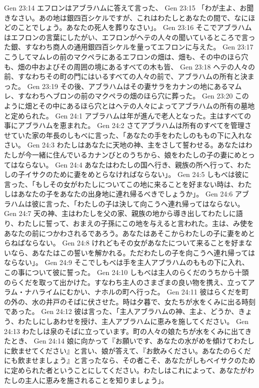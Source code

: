 Gen 23:14  エフロンはアブラハムに答えて言った、
Gen 23:15  「わが主よ、お聞きなさい。あの地は銀四百シケルですが、これはわたしとあなたの間で、なにほどのことでしょう。あなたの死人を葬りなさい」。
Gen 23:16  そこでアブラハムはエフロンの言葉にしたがい、エフロンがヘテの人々の聞いているところで言った銀、すなわち商人の通用銀四百シケルを量ってエフロンに与えた。
Gen 23:17  こうしてマムレの前のマクペラにあるエフロンの畑は、畑も、その中のほら穴も、畑の中およびその周囲の境にあるすべての木も皆、
Gen 23:18  ヘテの人々の前、すなわちその町の門にはいるすべての人々の前で、アブラハムの所有と決まった。
Gen 23:19  その後、アブラハムはその妻サラをカナンの地にあるマムレ、すなわちヘブロンの前のマクペラの畑のほら穴に葬った。
Gen 23:20  このように畑とその中にあるほら穴とはヘテの人々によってアブラハムの所有の墓地と定められた。
Gen 24:1  アブラハムは年が進んで老人となった。主はすべての事にアブラハムを恵まれた。
Gen 24:2  さてアブラハムは所有のすべてを管理させていた家の年長のしもべに言った、「あなたの手をわたしのももの下に入れなさい。
Gen 24:3  わたしはあなたに天地の神、主をさして誓わせる。あなたはわたしが今一緒に住んでいるカナンびとのうちから、娘をわたしの子の妻にめとってはならない。
Gen 24:4  あなたはわたしの国へ行き、親族の所へ行って、わたしの子イサクのために妻をめとらなければならない」。
Gen 24:5  しもべは彼に言った、「もしその女がわたしについてこの地に来ることを好まない時は、わたしはあなたの子をあなたの出身地に連れ帰るべきでしょうか」。
Gen 24:6  アブラハムは彼に言った、「わたしの子は決して向こうへ連れ帰ってはならない。
Gen 24:7  天の神、主はわたしを父の家、親族の地から導き出してわたしに語り、わたしに誓って、おまえの子孫にこの地を与えると言われた。主は、み使をあなたの前につかわされるであろう。あなたはあそこからわたしの子に妻をめとらねばならない。
Gen 24:8  けれどもその女があなたについて来ることを好まないなら、あなたはこの誓いを解かれる。ただわたしの子を向こうへ連れ帰ってはならない」。
Gen 24:9  そこでしもべは手を主人アブラハムのももの下に入れ、この事について彼に誓った。
Gen 24:10  しもべは主人のらくだのうちから十頭のらくだを取って出かけた。すなわち主人のさまざまの良い物を携え、立ってアラム・ナハライムにむかい、ナホルの町へ行った。
Gen 24:11  彼はらくだを町の外の、水の井戸のそばに伏させた。時は夕暮で、女たちが水をくみに出る時刻であった。
Gen 24:12  彼は言った、「主人アブラハムの神、主よ、どうか、きょう、わたしにしあわせを授け、主人アブラハムに恵みを施してください。
Gen 24:13  わたしは泉のそばに立っています。町の人々の娘たちが水をくみに出てきたとき、
Gen 24:14  娘に向かって『お願いです、あなたの水がめを傾けてわたしに飲ませてください』と言い、娘が答えて、『お飲みください。あなたのらくだにも飲ませましょう』と言ったなら、その者こそ、あなたがしもべイサクのために定められた者ということにしてください。わたしはこれによって、あなたがわたしの主人に恵みを施されることを知りましょう」。
